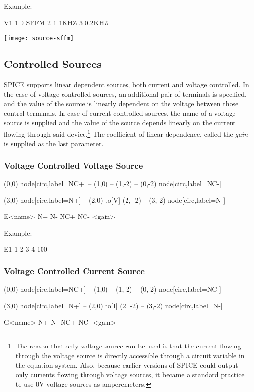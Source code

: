 Example:

\begin{code}
V1 1 0 SFFM 2 1 1KHZ 3 0.2KHZ 
\end{code}

\begin{center}
	\texttt{[image: source-sffm]}
\end{center}


\subsection{Controlled Sources}

SPICE supports linear dependent sources, both current and voltage controlled. In the case of voltage controlled sources, an additional pair of terminals is specified, and the value of the source is linearly dependent on the voltage between those control terminals. In case of current controlled sources, the name of a voltage source is supplied and the value of the source depends linearly on the current flowing through said device.\footnote{The reason that only voltage source can be used is that the current flowing through the voltage source is directly accessible through a circuit variable in the equation system. Also, because earlier versions of SPICE could output only currents flowing through voltage sources, it became a standard practice to use 0V voltage sources as amperemeters.} The coefficient of linear dependence, called the \textit{gain} is supplied as the last parameter.

\subsubsection{Voltage Controlled Voltage Source}
\begin{circuitdev}
	(0,0) node[circ,label=NC+]{} 
	-- (1,0)
	-- (1,-2)
	-- (0,-2) node[circ,label=NC-]{}
	
	(3,0) node[circ,label=N+]{}
	-- (2,0)
	to[V] (2, -2)
	-- (3,-2) node[circ,label=N-]{}
\end{circuitdev}
\begin{code}
E<name> N+ N- NC+ NC- <gain>
\end{code}



Example: 

\begin{code}
E1 1 2 3 4 100
\end{code}


\subsubsection{Voltage Controlled Current Source}
\begin{circuitdev}
	(0,0) node[circ,label=NC+]{} 
	-- (1,0)
	-- (1,-2)
	-- (0,-2) node[circ,label=NC-]{}
	
	(3,0) node[circ,label=N+]{}
	-- (2,0)
	to[I] (2, -2)
	-- (3,-2) node[circ,label=N-]{}
\end{circuitdev}
\begin{code}
G<name> N+ N- NC+ NC- <gain>
\end{code}

